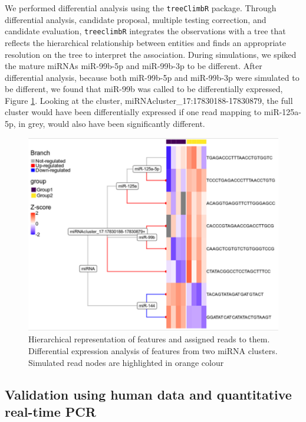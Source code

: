 \documentclass[12pt,twoside]{reedthesis}
\begin{document}
We performed differential analysis using the \texttt{treeClimbR} package. Through
differential analysis, candidate proposal, multiple testing correction,
and candidate evaluation, \texttt{treeclimbR} integrates the observations with a
tree that reflects the hierarchical relationship between entities and
finds an appropriate resolution on the tree to interpret the
association. During simulations, we spiked the mature miRNAs miR-99b-5p
and miR-99b-3p to be different. After differential analysis, because
both miR-99b-5p and miR-99b-3p were simulated to be different, we found
that miR-99b was called to be differentially expressed, Figure \ref{fig:3f16}.
Looking at the cluster, miRNAcluster\_17:17830188-17830879, the full
cluster would have been differentially expressed if one read mapping to
miR-125a-5p, in grey, would also have been significantly different.


\begin{figure}[htbp]

{\centering \includegraphics{thesis_files/figure-latex/3f16-1} 

}

\caption{Hierarchical representation of features and assigned reads to them. Differential expression analysis of features from two miRNA clusters. Simulated read nodes are highlighted in orange colour}\label{fig:3f16}
\end{figure}
\hypertarget{validation-using-human-data-and-quantitative-real-time-pcr}{%
\subsection{Validation using human data and quantitative real-time PCR}\label{validation-using-human-data-and-quantitative-real-time-pcr}}
\end{document}
